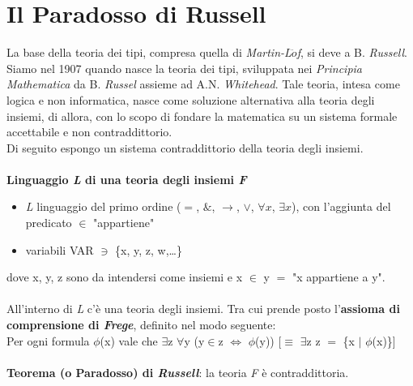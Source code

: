 \section{Il Paradosso di Russell}
\label{sec:paradosso-di-russell}
La base della teoria dei tipi, compresa quella di \textit{Martin-L$\ddot{o}$f}, si deve a B. \textit{Russell}. \\
Siamo nel 1907 quando nasce la teoria dei tipi, sviluppata nei \textit{Principia Mathematica} da B. \textit{Russel} assieme ad A.N. \textit{Whitehead}. Tale teoria, intesa come logica e non informatica, nasce come soluzione alternativa alla teoria degli insiemi, di allora, con lo scopo di fondare la matematica su un sistema formale accettabile e non contraddittorio.\\
Di seguito espongo un sistema contraddittorio della teoria degli insiemi.\\
\\
\textbf{Linguaggio \textit{L} di una teoria degli insiemi \textit{F}}\mbox{}
\begin{itemize}
\item \textit{L} linguaggio del primo ordine ($=$, $\&$, $\rightarrow$, $\lor$, $\forall{x}$, $\exists{x}$), con l'aggiunta del predicato $\in$ "appartiene"
\item variabili VAR $\ni$ \{x, y, z, w,\dots \}
\end{itemize}
\noindent
dove x, y, z sono da intendersi come insiemi e x $\in$ y $=$ "x appartiene a y".\\\\
All'interno di \textit{L} c'\`e una teoria degli insiemi. Tra cui prende posto l'\textbf{assioma di comprensione di \textit{Frege}}, definito nel modo seguente:\\
Per ogni formula $\phi$(x) vale che $\exists$z $\forall$y (y$\in$z $\Leftrightarrow$ $\phi$(y)) [$\equiv$ $\exists$z z $=$ \{x $\big|$ $\phi$(x)\}]\\\\
\textbf{Teorema (o Paradosso) di \textit{Russell}}: la teoria \textit{F} \`e contraddittoria.\\

